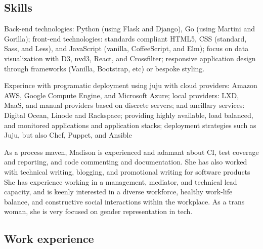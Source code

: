 \subsection{Skills}

\begin{description}
\tightlist
\item[Web development]
Back-end technologies: Python (using Flask and Django), Go (using
Martini and Gorilla); front-end technologies: standards compliant HTML5,
CSS (standard, Sass, and Less), and JavaScript (vanilla, CoffeeScript,
and Elm); focus on data visualization with D3, nvd3, React, and
Crossfilter; responsive application design through frameworks (Vanilla,
Bootstrap, etc) or bespoke styling.
\item[Cloud and DevOps]
Experince with programatic deployment using juju with cloud providers:
Amazon AWS, Google Compute Engine, and Microsoft Azure; local providers:
LXD, MaaS, and manual providers based on discrete servers; and ancillary
services: Digital Ocean, Linode and Rackspace; providing highly
available, load balanced, and monitored applications and application
stacks; deployment strategies such as Juju, but also Chef, Puppet, and
Ansible
\item[Ancillary skills]
As a process maven, Madison is experienced and adamant about CI, test
coverage and reporting, and code commenting and documentation. She has
also worked with technical writing, blogging, and promotional writing
for software products She has experience working in a management,
mediator, and technical lead capacity, and is keenly interested in a
diverse workforce, healthy work-life balance, and constructive social
interactions within the workplace. As a trans woman, she is very focused
on gender representation in tech.
\end{description}

\subsection{Work experience}

